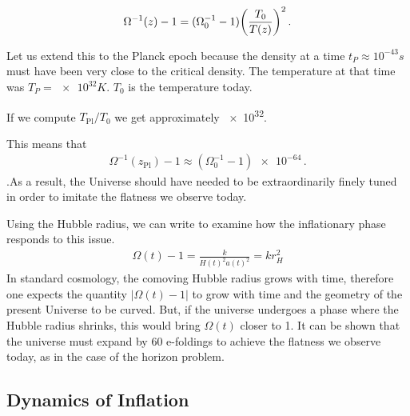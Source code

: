 \begin{align}
  \Omega ^{-1} (z) -1
  = (\Omega_0 ^{-1} -1)\qty(\frac{T_0 }{T(z)})^{2} \,.
\end{align}

Let us extend this to the Planck epoch because the density at a time $t_P \approx 10^{-43}s$ must have been very close to the critical density. The temperature at that time was $T_P = \num{e32} K $. $T_{0}$ is the temperature today.


If we compute \(T _{\text{Pl}} / T_0 \) we get approximately \num{e32}.

This means that 
\begin{align}
    \Omega^{-1}(z_{\text{Pl}}) - 1 \approx (\Omega_0^{-1} - 1) \num{e-64}\,.
\end{align}
.As a result, the Universe should have needed to be extraordinarily finely tuned in order to imitate the flatness we observe today.

Using the Hubble radius, we can write to examine how the inflationary phase responds to this issue.
\begin{align}
    \Omega(t)-1 = \frac{k}{H(t)^{2} a(t)^{2}} = kr_{H}^2
\end{align}
In standard cosmology, the comoving Hubble radius grows with time,
therefore one expects the quantity $|\Omega(t)-1|$ to grow with time and the geometry of the present Universe to be curved. But,
if the universe undergoes a phase where the Hubble radius shrinks, this would bring $\Omega(t)$ closer to 1. It can be shown that the universe must expand by 60 e-foldings to achieve the flatness we observe today, as in the case of the horizon problem.



\subsection{Dynamics of Inflation}

